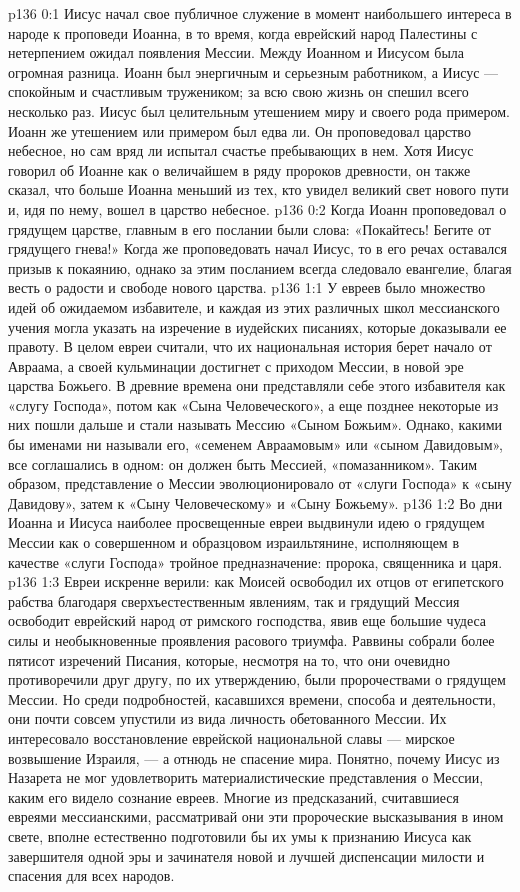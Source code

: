 \author{Комиссия срединников}
\vs p136 0:1 Иисус начал свое публичное служение в момент наибольшего интереса в народе к проповеди Иоанна, в то время, когда еврейский народ Палестины с нетерпением ожидал появления Мессии. Между Иоанном и Иисусом была огромная разница. Иоанн был энергичным и серьезным работником, а Иисус --- спокойным и счастливым тружеником; за всю свою жизнь он спешил всего несколько раз. Иисус был целительным утешением миру и своего рода примером. Иоанн же утешением или примером был едва ли. Он проповедовал царство небесное, но сам вряд ли испытал счастье пребывающих в нем. Хотя Иисус говорил об Иоанне как о величайшем в ряду пророков древности, он также сказал, что больше Иоанна меньший из тех, кто увидел великий свет нового пути и, идя по нему, вошел в царство небесное.
\vs p136 0:2 Когда Иоанн проповедовал о грядущем царстве, главным в его послании были слова: «Покайтесь! Бегите от грядущего гнева!» Когда же проповедовать начал Иисус, то в его речах оставался призыв к покаянию, однако за этим посланием всегда следовало евангелие, благая весть о радости и свободе нового царства.
\vs p136 1:1 У евреев было множество идей об ожидаемом избавителе, и каждая из этих различных школ мессианского учения могла указать на изречение в иудейских писаниях, которые доказывали ее правоту. В целом евреи считали, что их национальная история берет начало от Авраама, а своей кульминации достигнет с приходом Мессии, в новой эре царства Божьего. В древние времена они представляли себе этого избавителя как «слугу Господа», потом как «Сына Человеческого», а еще позднее некоторые из них пошли дальше и стали называть Мессию «Сыном Божьим». Однако, какими бы именами ни называли его, «семенем Авраамовым» или «сыном Давидовым», все соглашались в одном: он должен быть Мессией, «помазанником». Таким образом, представление о Мессии эволюционировало от «слуги Господа» к «сыну Давидову», затем к «Сыну Человеческому» и «Сыну Божьему».
\vs p136 1:2 Во дни Иоанна и Иисуса наиболее просвещенные евреи выдвинули идею о грядущем Мессии как о совершенном и образцовом израильтянине, исполняющем в качестве «слуги Господа» тройное предназначение: пророка, священника и царя.
\vs p136 1:3 Евреи искренне верили: как Моисей освободил их отцов от египетского рабства благодаря сверхъестественным явлениям, так и грядущий Мессия освободит еврейский народ от римского господства, явив еще большие чудеса силы и необыкновенные проявления расового триумфа. Раввины собрали более пятисот изречений Писания, которые, несмотря на то, что они очевидно противоречили друг другу, по их утверждению, были пророчествами о грядущем Мессии. Но среди подробностей, касавшихся времени, способа и деятельности, они почти совсем упустили из вида личность обетованного Мессии. Их интересовало восстановление еврейской национальной славы --- мирское возвышение Израиля, --- а отнюдь не спасение мира. Понятно, почему Иисус из Назарета не мог удовлетворить материалистические представления о Мессии, каким его видело сознание евреев. Многие из предсказаний, считавшиеся евреями мессианскими, рассматривай они эти пророческие высказывания в ином свете, вполне естественно подготовили бы их умы к признанию Иисуса как завершителя одной эры и зачинателя новой и лучшей диспенсации милости и спасения для всех народов.
